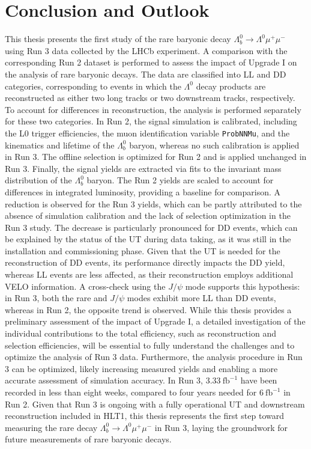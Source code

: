 \chapter{Conclusion and Outlook}
\label{ch:conclusion}
This thesis presents the first study of the rare baryonic decay $\Lambda_b^0 \to \Lambda^0 \mu^+ \mu^-$ using Run 3 data collected by the LHCb experiment. A comparison with the corresponding Run 2 dataset is performed to assess the impact of Upgrade I on the analysis of rare baryonic decays. The data are classified into LL and DD categories, corresponding to events in which the $\Lambda^0$ decay products are reconstructed as either two long tracks or two downstream tracks, respectively. To account for differences in reconstruction, the analysis is performed separately for these two categories. In Run 2, the signal simulation is calibrated, including the L0 trigger efficiencies, the muon identification variable \texttt{ProbNNMu}, and the kinematics and lifetime of the $\Lambda_b^0$ baryon, whereas no such calibration is applied in Run 3. The offline selection is optimized for Run 2 and is applied unchanged in Run 3. Finally, the signal yields are extracted via fits to the invariant mass distribution of the $\Lambda_b^0$ baryon.
The Run 2 yields are scaled to account for differences in integrated luminosity, providing a baseline for comparison. A reduction is observed for the Run 3 yields, which can be partly attributed to the absence of simulation calibration and the lack of selection optimization in the Run 3 study. The decrease is particularly pronounced for DD events, which can be explained by the status of the UT during data taking, as it was still in the installation and commissioning phase. Given that the UT is needed for the reconstruction of DD events, its performance directly impacts the DD yield, whereas LL events are less affected, as their reconstruction employs additional VELO information. A cross-check using the $J/\psi$ mode supports this hypothesis: in Run 3, both the rare and $J/\psi$ modes exhibit more LL than DD events, whereas in Run 2, the opposite trend is observed. While this thesis provides a preliminary assessment of the impact of Upgrade I, a detailed investigation of the individual contributions to the total efficiency, such as reconstruction and selection efficiencies, will be essential to fully understand the challenges and to optimize the analysis of Run 3 data. Furthermore, the analysis procedure in Run 3 can be optimized, likely increasing measured yields and enabling a more accurate assessment of simulation accuracy. In Run 3, $\qty{3.33}{\femto\barn}^{-1}$ have been recorded in less than eight weeks, compared to four years needed for $\qty{6}{\femto\barn}^{-1}$ in Run 2. Given that Run 3 is ongoing with a fully operational UT and downstream reconstruction included in HLT1, this thesis represents the first step toward measuring the rare decay $\Lambda_b^0 \to \Lambda^0 \mu^+ \mu^-$ in Run 3, laying the groundwork for future measurements of rare baryonic decays.


